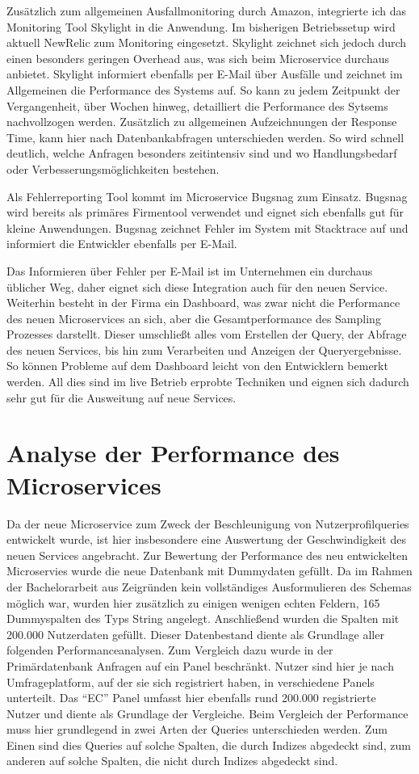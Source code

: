 Zusätzlich zum allgemeinen Ausfallmonitoring durch Amazon, integrierte ich das Monitoring Tool Skylight \cite{skylight} in die Anwendung. Im bisherigen Betriebssetup wird aktuell NewRelic \cite{newrelic} zum Monitoring eingesetzt. Skylight zeichnet sich jedoch durch einen besonders geringen Overhead aus, was sich beim Microservice durchaus anbietet. Skylight informiert ebenfalls per E-Mail über Ausfälle und zeichnet im Allgemeinen die Performance des Systems auf. So kann zu jedem Zeitpunkt der Vergangenheit, über Wochen hinweg, detailliert die Performance des Sytsems nachvollzogen werden. Zusätzlich zu allgemeinen Aufzeichnungen der Response Time, kann hier nach Datenbankabfragen unterschieden werden. So wird schnell deutlich, welche Anfragen besonders zeitintensiv sind und wo Handlungsbedarf oder Verbesserungsmöglichkeiten bestehen. 

Als Fehlerreporting Tool kommt im Microservice Bugsnag \cite{bugsnag} zum Einsatz. Bugsnag wird bereits als primäres Firmentool verwendet und eignet sich ebenfalls gut für kleine Anwendungen. Bugsnag zeichnet Fehler im System mit Stacktrace auf und informiert die Entwickler ebenfalls per E-Mail.

Das Informieren über Fehler per E-Mail ist im Unternehmen ein durchaus üblicher Weg, daher eignet sich diese Integration auch für den neuen Service. Weiterhin besteht in der Firma ein Dashboard, was zwar nicht die Performance des neuen Microservices an sich, aber die Gesamtperformance des Sampling Prozesses darstellt. Dieser umschließt alles vom Erstellen der Query, der Abfrage des neuen Services, bis hin zum Verarbeiten und Anzeigen der Queryergebnisse. So können Probleme auf dem Dashboard leicht von den Entwicklern bemerkt werden. All dies sind im live Betrieb erprobte Techniken und eignen sich dadurch sehr gut für die Ausweitung auf neue Services.

\section{Analyse der Performance des Microservices}
Da der neue Microservice zum Zweck der Beschleunigung von Nutzerprofilqueries entwickelt wurde, ist hier insbesondere eine Auswertung der Geschwindigkeit des neuen Services angebracht. 
Zur Bewertung der Performance des neu entwickelten Microservies wurde die neue Datenbank mit Dummydaten gefüllt. Da im Rahmen der Bachelorarbeit aus Zeigründen kein vollständiges Ausformulieren des Schemas möglich war, wurden hier zusätzlich zu einigen wenigen echten Feldern, 165 Dummyspalten des Typs String angelegt. Anschließend wurden die Spalten mit 200.000 Nutzerdaten gefüllt. Dieser Datenbestand diente als Grundlage aller folgenden Performanceanalysen. Zum Vergleich dazu wurde in der Primärdatenbank Anfragen auf ein Panel beschränkt. Nutzer sind hier je nach Umfrageplatform, auf der sie sich registriert haben, in verschiedene Panels unterteilt. Das ``EC'' Panel umfasst hier ebenfalls rund 200.000 registrierte Nutzer und diente als Grundlage der Vergleiche.
Beim Vergleich der Performance muss hier grundlegend in zwei Arten der Queries unterschieden werden. Zum Einen sind dies Queries auf solche Spalten, die durch Indizes abgedeckt sind, zum anderen auf solche Spalten, die nicht durch Indizes abgedeckt sind.

